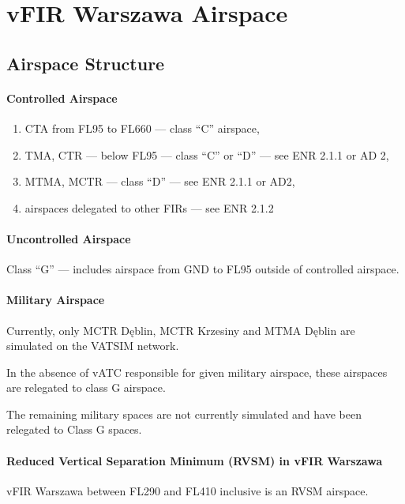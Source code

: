 \chapter{vFIR Warszawa Airspace}%
\label{ch:airspace}
\section{Airspace Structure}%
\label{sect:airspace:structure}

\subsubsection{Controlled Airspace}
\begin{enumerate}[label={\alph*)}]
    \item CTA from FL95 to FL660 --- class ``C'' airspace,
    \item TMA, CTR --- below FL95 --- class ``C'' or ``D'' --- see ENR 2.1.1 or AD 2,
    \item MTMA, MCTR --- class ``D'' --- see ENR 2.1.1 or AD2,
    \item airspaces delegated to other FIRs --- see ENR 2.1.2
\end{enumerate}

\subsubsection{Uncontrolled Airspace}
Class ``G'' --- includes airspace from GND to FL95 outside of controlled airspace.

\subsubsection{Military Airspace}

Currently, only MCTR Dęblin, MCTR Krzesiny and MTMA Dęblin are simulated on the VATSIM network.

In the absence of vATC responsible for given military airspace, these airspaces are relegated to class G airspace.

The remaining military spaces are not currently simulated and have been relegated to Class G spaces.

\subsubsection{Reduced Vertical Separation Minimum (RVSM) in vFIR Warszawa}
\label{sssec:airspace:rvsm}
vFIR Warszawa between FL290 and FL410 inclusive is an RVSM airspace.

